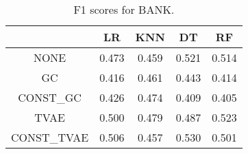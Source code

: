 \begin{table}
\caption{F1 scores for BANK.}
\label{tab:f1-BANK}
\begin{tabular}{ccccc}
\toprule
 & LR & KNN & DT & RF \\
\midrule
NONE & 0.473 & 0.459 & 0.521 & 0.514 \\
GC & 0.416 & 0.461 & 0.443 & 0.414 \\
CONST\_GC & 0.426 & 0.474 & 0.409 & 0.405 \\
TVAE & 0.500 & 0.479 & 0.487 & 0.523 \\
CONST\_TVAE & 0.506 & 0.457 & 0.530 & 0.501 \\
\bottomrule
\end{tabular}
\end{table}

